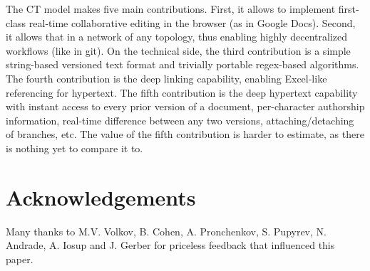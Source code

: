 \documentclass{sig-alternate}
\begin{document}
The CT model makes five main contributions. First, it allows to implement first-class real-time collaborative editing in the browser (as in Google Docs). Second, it allows that in a network of any topology, thus enabling highly decentralized workflows (like in git). 
On the technical side, the third contribution is a simple string-based versioned text format and trivially portable regex-based algorithms. 
The fourth contribution is the deep linking capability, enabling Excel-like referencing for hypertext.
The fifth contribution is the deep hypertext capability with instant access to every prior version of a document, per-character authorship information, real-time difference between any two versions, attaching/detaching of branches, etc.
The value of the fifth contribution is harder to estimate, as there is nothing yet to compare it to.


\section{Acknowledgements}

Many thanks to M.V. Volkov, B. Cohen, A. Pronchenkov, S. Pupyrev, N. Andrade, A. Iosup and J. Gerber for priceless feedback that influenced this paper. 

\small

\end{document}
